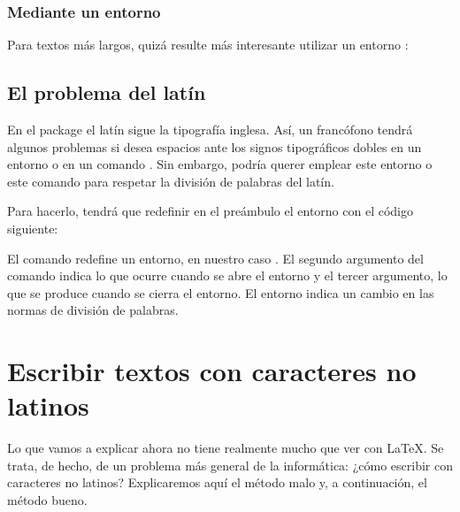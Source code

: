 \subsubsection{Mediante un entorno}

Para textos más largos, quizá resulte más interesante utilizar un entorno :


\subsection{El problema del latín}\label{redefinirlatin}

En el package  el latín sigue la tipografía inglesa. Así, un francófono tendrá algunos problemas si desea espacios ante los signos tipográficos dobles en un entorno  o en un comando .
Sin embargo, podría querer emplear este entorno o este comando para respetar la división de palabras del latín.

Para hacerlo, tendrá que redefinir en el preámbulo el entorno  con el código siguiente:

\begin{latexcode}
\renewenvironment{latin}{\begin{hyphenrules}{latin}}%
{\end{hyphenrules}}
\end{latexcode}

\begin{plusloins}
El comando  redefine un entorno, en nuestro caso . El segundo argumento del comando indica lo que ocurre cuando se abre el entorno y el tercer argumento, lo que se produce cuando se cierra el entorno. El entorno  indica un cambio en las normas de división de palabras.
\end{plusloins}


\section{Escribir textos con caracteres no latinos}\label{utf8}

Lo que vamos a explicar ahora no tiene realmente mucho que ver con \LaTeX. Se trata, de hecho, de un problema más general de la informática: ¿cómo escribir con caracteres no latinos? Explicaremos aquí el método malo y, a continuación, el método bueno.

